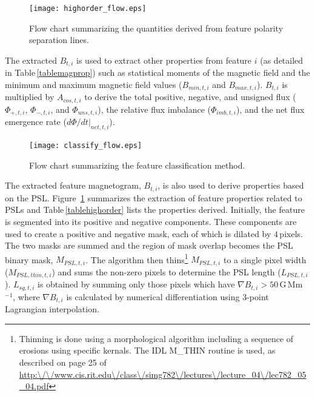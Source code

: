 \begin{figure}[!t]
\centerline{\texttt{[image: highorder\_flow.eps]}}
\caption[SMART characterisation method for PSLs.]{Flow chart summarizing the quantities derived from feature polarity separation lines.}\label{flow_highorder}
\end{figure}

The extracted $B_{t,i}$ is used to extract other properties from feature $i$ (as detailed in Table\,\ref{tablemagprop}) such as statistical moments of the magnetic field and the minimum and maximum magnetic field values ($B_{min,t,i}$ and $B_{max,t,i}$). $B_{t,i}$ is multiplied by $A_{cos,t,i}$ to derive the total positive, negative, and unsigned flux (${\Phi}_{+,t,i}$, ${\Phi}_{-,t,i}$, and ${\Phi}_{uns,t,i}$), the relative flux imbalance (${\Phi}_{imb,t,i}$), and the net flux emergence rate (${{d\Phi}/{dt}}|_{net,t,i}$).

\begin{figure}[!t]
\centerline{\texttt{[image: classify\_flow.eps]}}
\caption[The SMART classification method.]{Flow chart summarizing the feature classification method.}
\label{flow_class}
\end{figure}

The extracted feature magnetogram, $B_{t,i}$, is also used to derive properties based on the \gls{PSL}. Figure~\ref{flow_highorder} summarizes the extraction of feature properties related to \glspl{PSL} and Table\,\ref{tablehighorder} lists the properties derived. Initially, the feature is segmented into its positive and negative components. These components are used to create a positive and negative mask, each of which is dilated by $4$\,pixels. The two masks are summed and the region of mask overlap becomes the \gls{PSL} binary mask, $M_{PSL,t,i}$. The algorithm then thins\footnote{Thinning is done using a morphological algorithm including a sequence of erosions using specific kernals. The IDL M_THIN routine is used, as described on page 25 of \url{http:\/\/www.cis.rit.edu\/class\/simg782\/lectures\/lecture_04\/lec782_05_04.pdf}} $M_{PSL,t,i}$ to a single pixel width ($M_{PSL,thin,t,i}$) and sums the non-zero pixels to determine the \gls{PSL} length ($L_{PSL,t,i}$).  $L_{sg,t,i}$ is obtained by summing only those pixels which have $\nabla B_{t,i} > 50$\,G\,Mm$^{-1}$, where $\nabla B_{t,i}$ is calculated by numerical differentiation using 3-point Lagrangian interpolation. 

